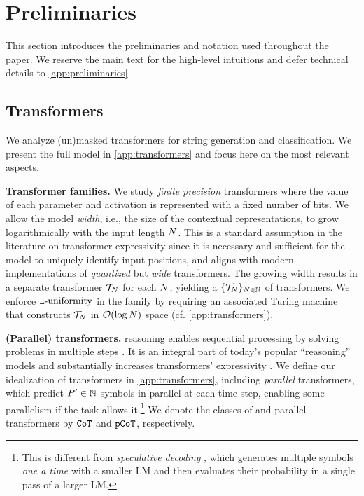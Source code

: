 \documentclass{article} %
\begin{document}
\section{Preliminaries} \label{sec:preliminaries}

This section introduces the preliminaries and notation used throughout the paper.
We reserve the main text for the high-level intuitions and defer technical details to \cref{app:preliminaries}.


\subsection{Transformers}

We analyze (un)masked transformers for string generation and classification.
We present the full model in \cref{app:transformers} and focus here on the most relevant aspects.

\textbf{Transformer families.}
We study \emph{finite precision} transformers where the value of each parameter and activation is represented with a fixed number of bits.
We allow the model \emph{width}, i.e., the size of the contextual representations, to grow logarithmically with the input length ${{N}}$.
This is a standard assumption in the literature on transformer expressivity \citep{li2024chain} since it is necessary and sufficient for the model to uniquely identify input positions, and aligns with modern implementations of \emph{quantized} but \emph{wide} transformers.
The growing width results in a separate transformer ${{\mathcal{T}}}_{{N}}$ for each ${{N}}$, yielding a  $\{{{\mathcal{T}}}_{{N}}\}_{{{N}} \in {{\mathbb{N}}}}$ of transformers. 
We enforce ${{\mathtt{L}}\textnormal{-uniformity}}$ in the family by requiring an associated Turing machine that constructs ${{\mathcal{T}}}_{{N}}$ in ${{{{\mathcal{O}}}(\log{{N}})}}$ space (cf. \cref{app:transformers}).

\textbf{(Parallel) \CoTAcr transformers.}
\CoTAcr reasoning enables sequential processing by solving problems in multiple steps \citep{wei2022chainofthought}.
It is an integral part of today's popular ``reasoning'' models and substantially increases transformers' expressivity \citep{li2024chain,merrill2024the}.
We define our idealization of \CoTAcr transformers in \cref{app:transformers}, including \emph{parallel} \CoTAcr transformers,
which predict ${P}' \in {{\mathbb{N}}}$ symbols in parallel at each time step,
enabling some parallelism if the task allows it.\footnote{This is different from \emph{speculative decoding} \citep{10.5555/3618408.3619203}, which generates multiple symbols \emph{one a time} with a smaller LM and then evaluates their probability in a single pass of a larger LM.}
We denote the classes of \CoTAcr and parallel \CoTAcr transformers by ${\mathtt{CoT}}$ and ${\mathtt{pCoT}}$, respectively.
\end{document}
